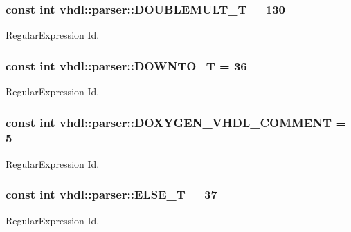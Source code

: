 \subsubsection[{D\+O\+U\+B\+L\+E\+M\+U\+L\+T\+\_\+\+T}]{\setlength{\rightskip}{0pt plus 5cm}const int vhdl\+::parser\+::\+D\+O\+U\+B\+L\+E\+M\+U\+L\+T\+\_\+\+T = 130}\label{namespacevhdl_1_1parser_a7dce0594ff69d220df22f5d15c86cd60}
Regular\+Expression Id. \hypertarget{namespacevhdl_1_1parser_ae3f26571d757560cc3108872480ffea4}{}
\subsubsection[{D\+O\+W\+N\+T\+O\+\_\+\+T}]{\setlength{\rightskip}{0pt plus 5cm}const int vhdl\+::parser\+::\+D\+O\+W\+N\+T\+O\+\_\+\+T = 36}\label{namespacevhdl_1_1parser_ae3f26571d757560cc3108872480ffea4}
Regular\+Expression Id. \hypertarget{namespacevhdl_1_1parser_a2d0a0373c10977aef4364020b1c39fe0}{}
\subsubsection[{D\+O\+X\+Y\+G\+E\+N\+\_\+\+V\+H\+D\+L\+\_\+\+C\+O\+M\+M\+E\+N\+T}]{\setlength{\rightskip}{0pt plus 5cm}const int vhdl\+::parser\+::\+D\+O\+X\+Y\+G\+E\+N\+\_\+\+V\+H\+D\+L\+\_\+\+C\+O\+M\+M\+E\+N\+T = 5}\label{namespacevhdl_1_1parser_a2d0a0373c10977aef4364020b1c39fe0}
Regular\+Expression Id. \hypertarget{namespacevhdl_1_1parser_ab7588ef546e3cddf7728fff5338aaccc}{}
\subsubsection[{E\+L\+S\+E\+\_\+\+T}]{\setlength{\rightskip}{0pt plus 5cm}const int vhdl\+::parser\+::\+E\+L\+S\+E\+\_\+\+T = 37}\label{namespacevhdl_1_1parser_ab7588ef546e3cddf7728fff5338aaccc}
Regular\+Expression Id. \hypertarget{namespacevhdl_1_1parser_a7fcde94ed0a6fa20307d7eb936ef9ced}{}
